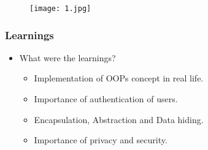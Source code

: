 \documentclass[12pt]{beamer}
\begin{document}
\begin{figure}[htpb]
\centerline{\texttt{[image: 1.jpg]}}
\end{figure}

\begin{frame}
    \frametitle{Learnings}
    \begin{itemize}          
        \item What were the learnings?
             \begin{itemize}
             \item { Implementation of OOPs concept in real life. }
             \item { Importance of authentication of users. }
             \item { Encapsulation, Abstraction and Data hiding. }
             \item { Importance of privacy and security. } 
             \end{itemize}
             
       
    \end{itemize}       
\end{frame}
\end{document}
